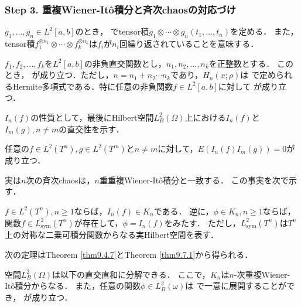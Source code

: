 \subsubsection*{Step 3. 重複Wiener-It\^o積分と斉次chaosの対応づけ}
\begin{definition}%
$g_1,...,g_n\in L^2[a,b]$のとき，
でtensor積$g_1\otimes\cdots\otimes g_n(t_1,...,t_n)$を定める．
また，tensor積$f_1^{\otimes n_1}\otimes\cdots\otimes f_k^{\otimes n_k}$は$f_i$が$n_i$回繰り返されていることを意味する．
\end{definition}


\begin{theorem}\label{thm9.6.9}%
$f_1,f_2,...,f_k$を$L^2[a,b]$の非負直交関数とし，$n_1,n_2,...,n_k$を正整数とする．
このとき，
が成り立つ．ただし，$n=n_1+n_2\cdots n_k$であり，$H_{n}(x;\rho)$は
で定められるHermite多項式である．特に任意の非負関数$f\in L^2[a,b]$に対して
が成り立つ．
\end{theorem}

$I_n(f)$の性質として，最後にHilbert空間$L^2_B(\Omega)$上における$I_n(f)$と$I_m(g),n\neq m$の直交性を示す．
\begin{theorem}\label{thm9.6.10}%
任意の$f\in L^2(T^n),g\in L^2(T^m)$と$n\neq m$に対して，$E\left(I_n(f)I_m(g)\right)=0$が成り立つ．
\end{theorem}

実は$n$次の斉次chaosは，$n$重重複Wiener-It\^o積分と一致する．
この事実を次で示す．
\begin{theorem}\label{thm9.7.1}%
$f\in L^2(T^n),n\ge1$ならば，$I_n(f)\in K_n$である．
逆に，$\phi\in K_n,n\ge1$ならば，関数$f\in L^2_\mathrm{sym}(T^n)$が存在して，$\phi=I_n(f)$をみたす．
ただし，$L^2_\mathrm{sym}(T^n)$は$T^n$上の対称な二乗可積分関数からなる実Hilbert空間を表す．
\end{theorem}

次の定理はTheorem \ref{thm9.4.7}とTheorem \ref{thm9.7.1}から得られる．
\begin{theorem}[Wiener-It\^o]\label{thm9.7.3}%
空間$L^2_B(\Omega)$は以下の直交直和に分解できる．
ここで，$K_n$は$n$-次重複Wiener-It\^o積分からなる．
また，任意の関数$\phi\in L^2_B(\omega)$は
で一意に展開することができ，
が成り立つ．
\end{theorem}

